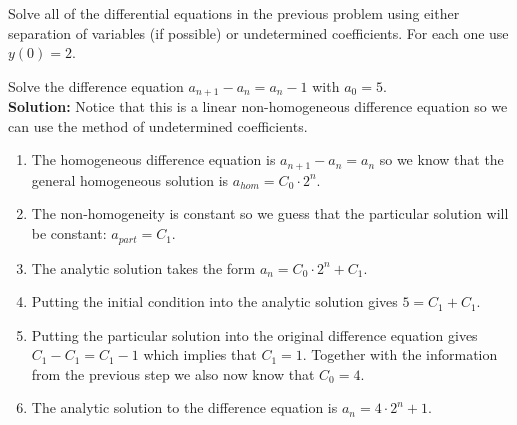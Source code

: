 \begin{problem}
    Solve all of the differential equations in the previous problem using either
    separation of variables (if possible) or undetermined coefficients. For each one use
    $y(0) = 2$.
\end{problem}

% 


\begin{example}
    Solve the difference equation $a_{n+1} - a_n = a_n - 1$ with $a_0 = 5$.  \\{\bf
    Solution:} Notice that this is a linear non-homogeneous difference equation so we can
    use the method of undetermined coefficients.
    \begin{enumerate}
        \item The homogeneous difference equation is $a_{n+1} - a_n = a_n$ so we know that
            the general homogeneous solution is $a_{hom} = C_0\cdot 2^n$.
        \item The non-homogeneity is constant so we guess that the particular solution
            will be constant: $a_{part} = C_1$.
        \item The analytic solution takes the form $a_n = C_0 \cdot 2^n + C_1$.  
        \item Putting the initial condition into the analytic solution gives $5= C_1 +
            C_1$.
        \item Putting the particular solution into the original difference equation gives
            $C_1 - C_1 = C_1 - 1$ which implies that $C_1 = 1$.  Together with the
            information from the previous step we also now know that $C_0 = 4$.
        \item The analytic solution to the difference equation is $a_n = 4 \cdot 2^n + 1$.
    \end{enumerate}
\end{example}

